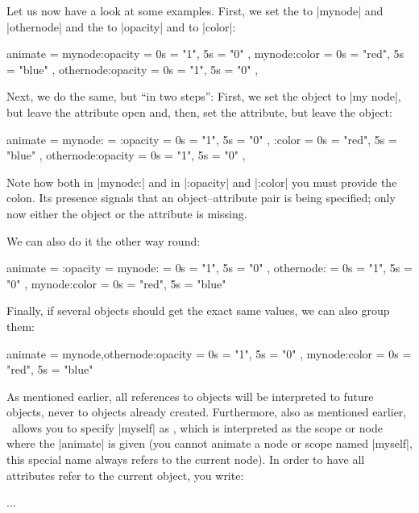 Let us now have a look at some examples. First, we set the
 to |mynode| and |othernode| and the
 to |opacity| and to |color|: 

\begin{codeexample}
animate = {
  mynode:opacity    = { 0s = "1",   5s = "0" },
  mynode:color      = { 0s = "red", 5s = "blue" },
  othernode:opacity = { 0s = "1",   5s = "0" },
}
\end{codeexample}

Next, we do the same, but ``in two steps'': First, we set the object
to |my node|, but leave the attribute open and, then, set the
attribute, but leave the object:
\begin{codeexample}
animate = {
  mynode: = {
    :opacity        = { 0s = "1",   5s = "0" },
    :color          = { 0s = "red", 5s = "blue" }
  },
  othernode:opacity = { 0s = "1",   5s = "0" },
}
\end{codeexample}
Note how both in  |mynode:| and in  |:opacity| and |:color| you must
provide the colon. Its presence signals that an object--attribute pair
is being specified; only now either the object or the attribute is
missing. 

We can also do it the other way round:
\begin{codeexample}
animate = {
  :opacity = {
    mynode:         = { 0s = "1",   5s = "0" },
    othernode:      = { 0s = "1",   5s = "0" }
  },
  mynode:color      = { 0s = "red", 5s = "blue" }
}
\end{codeexample}
Finally, if several objects should get the exact same values, we can
also group them:
\begin{codeexample}
animate = {
  {mynode,othernode}:opacity = { 0s = "1",   5s = "0" },
  mynode:color               = { 0s = "red", 5s = "blue" }
}
\end{codeexample}

As mentioned earlier, all references to objects will be interpreted to
future objects, never to objects already created. Furthermore, also as
mentioned earlier, \tikzname\ allows you to specify |myself| as
, which is interpreted as the scope or node where the
|animate| is given (you cannot animate a node or scope named |myself|,
this special name always refers to the current node). In order to have
all attributes refer to the current object, you write:
\begin{codeexample}
\begin{scope} [animate = {
                 myself: = { %
                   :opacity = { ... },
                   :xshift  = { ... }
                 }
               }]
  ...
\end{scope}
\end{codeexample}

